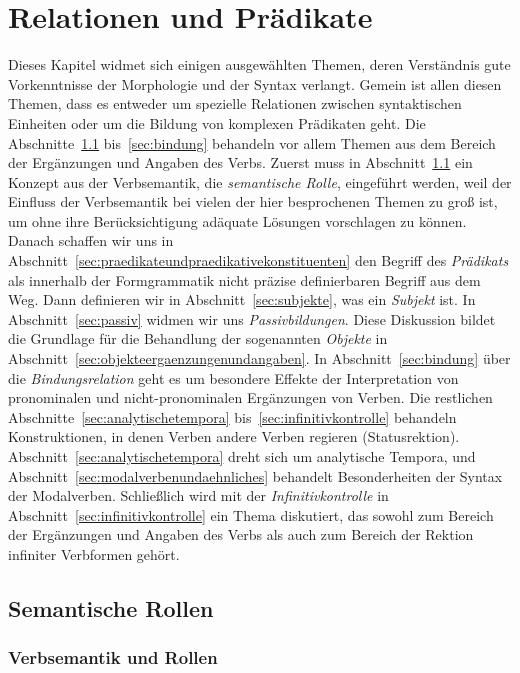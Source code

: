 \chapter{Relationen und Prädikate}
\label{sec:relationenundpraedikate}

Dieses Kapitel widmet sich einigen ausgewählten Themen, deren Verständnis gute Vorkenntnisse der Morphologie und der Syntax verlangt.
Gemein ist allen diesen Themen, dass es entweder um spezielle Relationen zwischen syntaktischen Einheiten oder um die Bildung von komplexen Prädikaten geht.
Die Abschnitte~\ref{sec:semantischerollen} bis~\ref{sec:bindung} behandeln vor allem Themen aus dem Bereich der Ergänzungen und Angaben des Verbs.
Zuerst muss in Abschnitt~\ref{sec:semantischerollen} ein Konzept aus der Verbsemantik, die \textit{semantische Rolle}, eingeführt werden, weil der Einfluss der Verbsemantik bei vielen der hier besprochenen Themen zu groß ist, um ohne ihre Berücksichtigung adäquate Lösungen vorschlagen zu können.
Danach schaffen wir uns in Abschnitt~\ref{sec:praedikateundpraedikativekonstituenten} den Begriff des \textit{Prädikats} als innerhalb der Formgrammatik nicht präzise definierbaren Begriff aus dem Weg.
Dann definieren wir in Abschnitt~\ref{sec:subjekte}, was ein \textit{Subjekt} ist.
In Abschnitt~\ref{sec:passiv} widmen wir uns \textit{Passivbildungen}.
Diese Diskussion bildet die Grundlage für die Behandlung der sogenannten \textit{Objekte} in Abschnitt~\ref{sec:objekteergaenzungenundangaben}.
In Abschnitt~\ref{sec:bindung} über die \textit{Bindungsrelation} geht es um besondere Effekte der Interpretation von pronominalen und nicht-pronominalen Ergänzungen von Verben.
Die restlichen Abschnitte~\ref{sec:analytischetempora} bis~\ref{sec:infinitivkontrolle} behandeln Konstruktionen, in denen Verben andere Verben regieren (Statusrektion).
Abschnitt~\ref{sec:analytischetempora} dreht sich um analytische Tempora, und Abschnitt~\ref{sec:modalverbenundaehnliches} behandelt Besonderheiten der Syntax der Modalverben.
Schließlich wird mit der \textit{Infinitivkontrolle} in Abschnitt~\ref{sec:infinitivkontrolle} ein Thema diskutiert, das sowohl zum Bereich der Ergänzungen und Angaben des Verbs als auch zum Bereich der Rektion infiniter Verbformen gehört.

\section{Semantische Rollen}
\label{sec:semantischerollen}

\subsection{Verbsemantik und Rollen}
\label{sec:verbsemantikundrollen}

